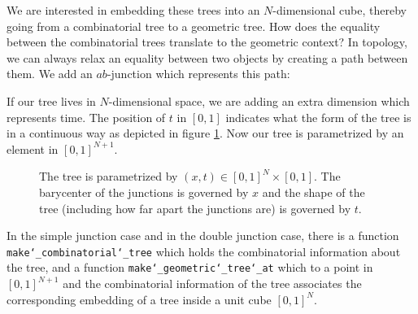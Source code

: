\documentclass[12pt]{amsart}
\newcommand\Bseries[1]{\Forest{Bseries #1}}
\theoremstyle{plain}
\theoremstyle{definition}
\theoremstyle{remark}
\begin{document}
We are interested in embedding these trees into an $N$-dimensional cube,
thereby going from a combinatorial tree to a geometric tree.
How does the equality between the combinatorial trees translate to the geometric context?
In topology, we can always relax an equality between two objects by creating a path between them.
We add an $ab$-junction which represents this path:
\begin{center}
  \Bseries{[,phantom,s sep = 5pt,[[, edge = forestgreen][, edge = forestgreen][, edge = forestgreen][, edge = forestgreen][, edge = forestgreen][, edge = forestgreen]]
  [[, edge = orange,label = {[label distance=0cm]180:$\rightarrow$}[, edge = purple][, edge = purple]][, edge = orange,[, edge = purple][, edge = purple]][,edge = orange,[, edge = purple][, edge = purple]]]]}
  
  
   \Bseries{[,phantom,s sep = 5pt, [[, edge = forestgreen][, edge = forestgreen][, edge = forestgreen][, edge = forestgreen][, edge = forestgreen][, edge = forestgreen]]
   [[, edge = purple,label = {[label distance=0.05cm]180:$\rightarrow$}[, edge = orange][, edge = orange][, edge = orange]][, edge = purple,[, edge = orange][, edge = orange][, edge = orange]]]]}
  \end{center}

If our tree lives in $N$-dimensional space, we are adding an extra dimension which represents time.
The position of $t$ in $[0,1]$ indicates what the form of the tree is in a continuous way as depicted in figure \ref{timeline}.
Now our tree is parametrized by an element in $[0,1]^{N+1}$.
\begin{figure}
  \def\svgwidth{0.8\hsize}
  
  \caption{The tree is parametrized by $(x,t)\in[0,1]^N\times [0,1]$. 
  The barycenter of the junctions is governed by $x$ and the shape of the tree (including how far apart the junctions are) is governed by $t$.}
  \label{timeline}  
\end{figure}
  
\begin{mdframed}[backgroundcolor=purple!10]
In the simple junction case and in the double junction case, there is a function \texttt{make\char`_combinatorial\char`_tree} which holds the combinatorial information about the tree,
and a function \texttt{make\char`_geometric\char`_tree\char`_at} which to a point in $[0,1]^{N+1}$ and the combinatorial information of the tree
associates the corresponding embedding of a tree inside a unit cube $[0,1]^N$.
\end{mdframed}
\end{document}
